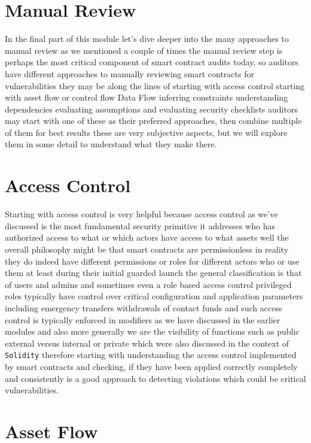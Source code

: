 \section{Manual Review}

In the final part of this module let's dive deeper into the many approaches to manual review as we mentioned a couple of times the manual review step is perhaps the most critical component of smart contract audits today, so auditors have different approaches to manually reviewing smart contracts for vulnerabilities they may be along the lines of starting with access control starting with asset flow or control flow Data Flow inferring constraints understanding dependencies evaluating assumptions and evaluating security checklists auditors may start with one of these as their preferred approaches, then combine multiple of them for best results these are very subjective aspects, but we will explore them in some detail to understand what they make there.

\section{Access Control}

Starting with access control is very helpful because access control as we've discussed is the most fundamental security primitive it addresses who has authorized access to what or which actors have access to what assets well the overall philosophy might be that smart contracts are permissionless in reality they do indeed have different permissions or roles for different actors who or use them at least during their initial guarded launch the general classification is that of users and admins and sometimes even a role based access control privileged roles typically have control over critical configuration and application parameters including emergency transfers withdrawals of contact funds and such access control is typically enforced in modifiers as we have discussed in the earlier modules and also more generally we are the visibility of functions such as public external versus internal or private which were also discussed in the context of \verb|Solidity| therefore starting with understanding the access control implemented by smart contracts and checking, if they have been applied correctly completely and consistently is a good approach to detecting violations which could be critical vulnerabilities.

\section{Asset Flow}

